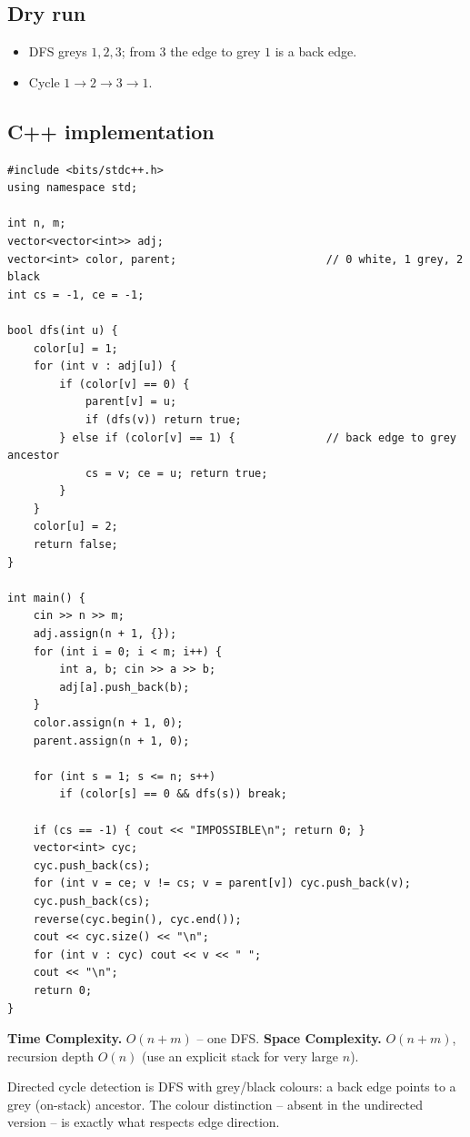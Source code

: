 \subsection*{Dry run}


\begin{itemize}
  \item DFS greys $1,2,3$; from $3$ the edge to grey $1$ is a back edge.
  \item Cycle $1\to2\to3\to1$.
\end{itemize}

\subsection*{C++ implementation}

\begin{lstlisting}
#include <bits/stdc++.h>
using namespace std;

int n, m;
vector<vector<int>> adj;
vector<int> color, parent;                       // 0 white, 1 grey, 2 black
int cs = -1, ce = -1;

bool dfs(int u) {
    color[u] = 1;
    for (int v : adj[u]) {
        if (color[v] == 0) {
            parent[v] = u;
            if (dfs(v)) return true;
        } else if (color[v] == 1) {              // back edge to grey ancestor
            cs = v; ce = u; return true;
        }
    }
    color[u] = 2;
    return false;
}

int main() {
    cin >> n >> m;
    adj.assign(n + 1, {});
    for (int i = 0; i < m; i++) {
        int a, b; cin >> a >> b;
        adj[a].push_back(b);
    }
    color.assign(n + 1, 0);
    parent.assign(n + 1, 0);

    for (int s = 1; s <= n; s++)
        if (color[s] == 0 && dfs(s)) break;

    if (cs == -1) { cout << "IMPOSSIBLE\n"; return 0; }
    vector<int> cyc;
    cyc.push_back(cs);
    for (int v = ce; v != cs; v = parent[v]) cyc.push_back(v);
    cyc.push_back(cs);
    reverse(cyc.begin(), cyc.end());
    cout << cyc.size() << "\n";
    for (int v : cyc) cout << v << " ";
    cout << "\n";
    return 0;
}
\end{lstlisting}

\begin{complexitybox}
\textbf{Time Complexity.} $O(n+m)$ -- one DFS. \textbf{Space Complexity.}
$O(n+m)$, recursion depth $O(n)$ (use an explicit stack for very large $n$).
\end{complexitybox}

\begin{takeawaybox}
Directed cycle detection is DFS with grey/black colours: a back edge points
to a grey (on-stack) ancestor. The colour distinction -- absent in the
undirected version -- is exactly what respects edge direction.
\end{takeawaybox}
